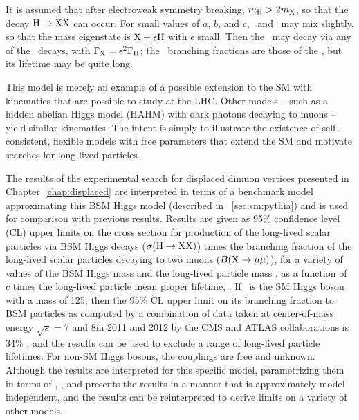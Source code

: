 It is assumed that after electroweak symmetry breaking, $m_{\mathrm{H}} > 2m_{\mathrm{X}}$, so that the decay $\mathrm{H} \to \mathrm{X}\mathrm{X}$ can occur.
For small values of $a$, $b$, and $c$, \PLLP\ and \PHiggs\ may mix slightly, so that the mass eigenstate is $\mathrm{X} + \epsilon \mathrm{H}$ with $\epsilon$ small.
Then the \PLLP\ may decay via any of the \PHiggs\ decays, with $\Gamma_{\mathrm{X}} = \epsilon^2 \Gamma_{\mathrm{H}}$; the \PLLP\ branching fractions are those of the \PHiggs, but its lifetime may be quite long.

This model is merely an example of a possible extension to the SM with kinematics that are possible to study at the LHC.
Other models -- such as a hidden abelian Higgs model (HAHM) with dark photons decaying to muons \cite{Curtin2015} -- yield similar kinematics.
The intent is simply to illustrate the existence of self-consistent, flexible models with free parameters that extend the SM and motivate searches for long-lived particles.

The results of the experimental search for displaced dimuon vertices presented in Chapter~\ref{chap:displaced} are interpreted in terms of a benchmark model approximating this BSM Higgs model (described in \Sec~\ref{sec:sm:pythia}) and is used for comparison with previous results.
Results are given as 95\% confidence level (CL) upper limits on the cross section for production of the long-lived scalar particles via BSM Higgs decays ($\sigma(\mathrm{H}\to \mathrm{X}\mathrm{X})$) times the branching fraction of the long-lived scalar particles decaying to two muons ($B(\mathrm{X}\to\mathrm{\mu}\mathrm{\mu})$), for a variety of values of the BSM Higgs mass \mH and the long-lived particle mass \mX, as a function of $c$ times the long-lived particle mean proper lifetime, \cTau.
If \PHiggs\ is the SM Higgs boson with a mass of 125\GeV, then the 95\% CL upper limit on its branching fraction to BSM particles as computed by a combination of data taken at center-of-mass energy $\sqrt{s} = 7$ and 8\TeV in 2011 and 2012 by the CMS and ATLAS collaborations is 34\% \cite{Aad2016}, and the results can be used to exclude a range of long-lived particle lifetimes.
For non-SM Higgs bosons, the couplings are free and unknown.
Although the results are interpreted for this specific model, parametrizing them in terms of \mH, \mX, and \cTau presents the results in a manner that is approximately model independent, and the results can be reinterpreted to derive limits on a variety of other models.


